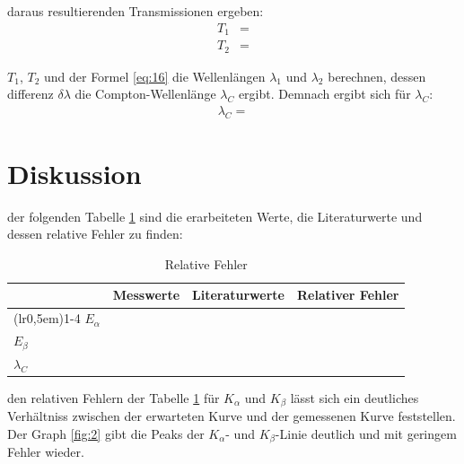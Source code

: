     \justifying daraus resultierenden Transmissionen ergeben:
    \begin{align}
        T_1 &= \text{} \label{eq:19}\\
        T_2 &= \text{} \label{eq:20}
    \end{align}

    \justifying $T_1$, $T_2$ und der Formel \eqref{eq:16} die Wellenlängen $\lambda_1$ und $\lambda_2$ berechnen, dessen differenz $\delta \lambda$ die Compton-Wellenlänge $\lambda_C$ ergibt.
    Demnach ergibt sich für $\lambda_C$:
    \begin{align}
        \lambda_C = \text{} \label{eq:21}
    \end{align}


\newpage
\section{Diskussion}

    \justifying der folgenden Tabelle \ref{tab:3} sind die erarbeiteten Werte, die Literaturwerte und dessen relative Fehler zu finden:

    \begin{table}[H]
    \centering
        \begin{tabular}{l c c r}
            \toprule
            \multicolumn{1}{c}{} & \multicolumn{1}{c}{Messwerte} & \multicolumn{1}{c}{Literaturwerte} & \multicolumn{1}{c}{Relativer Fehler}\\
            \cmidrule(lr{0,5em}){1-4}
            $E_{\alpha}$           &             &  \cite{NIST}            &  \\
            $E_{\beta}$            &             &  \cite{NIST}            &  \\
            $\lambda_C$            &             &  \cite{scipy}           &  \\
            \bottomrule
        \end{tabular}
    \caption{Relative Fehler}
    \label{tab:3}
    \end{table}

    \justifying den relativen Fehlern der Tabelle \ref{tab:3} für $K_{\alpha}$ und $K_{\beta}$ lässt sich ein deutliches Verhältniss zwischen der
    erwarteten Kurve und der gemessenen Kurve feststellen. Der Graph \ref{fig:2} gibt die Peaks der $K_{\alpha}$- und $K_{\beta}$-Linie deutlich und mit geringem 
    Fehler wieder. 


